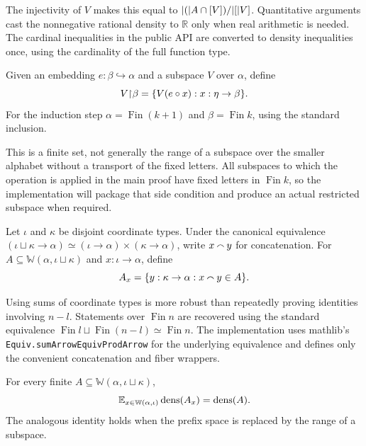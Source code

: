 The injectivity of $V$ makes this equal to
$\lvert (\rvert A\cap[V])/\lvert [\rvert V]$.  Quantitative arguments cast the nonnegative rational density to
$\mathbb R$ only when real arithmetic is needed.  The cardinal inequalities in the public API are
converted to density inequalities once, using the cardinality of the full function type.

\begin{definition}
\label{def:alphabet-restriction}
Given an embedding $e:\beta\hookrightarrow\alpha$ and a subspace $V$ over $\alpha$, define
\[
  V\mathord{\upharpoonright}\beta=\{V(e\circ x):x:\eta\to\beta\}.
\]
For the induction step $\alpha=\operatorname{Fin}(k+1)$ and
$\beta=\operatorname{Fin}k$, using the standard inclusion.
\end{definition}

This is a finite set, not generally the range of a subspace over the smaller alphabet without a
transport of the fixed letters.  All subspaces to which the operation is applied in the main proof
have fixed letters in $\operatorname{Fin}k$, so the implementation will package that side condition
and produce an actual restricted subspace when required.

\begin{definition}
\label{def:fiber}
Let $\iota$ and $\kappa$ be disjoint coordinate types.  Under the canonical equivalence
$(\iota\sqcup\kappa\to\alpha)\simeq(\iota\to\alpha)\times(\kappa\to\alpha)$, write
$x\mathbin{\smallfrown} y$ for concatenation.  For $A\subseteq\mathbb W(\alpha,\iota\sqcup\kappa)$ and
$x:\iota\to\alpha$, define
\[
  A_x=\{y:\kappa\to\alpha:x\mathbin{\smallfrown} y\in A\}.
\]
\end{definition}

Using sums of coordinate types is more robust than repeatedly proving identities involving
$n-l$.  Statements over $\operatorname{Fin}n$ are recovered using the standard equivalence
$\operatorname{Fin}l\sqcup\operatorname{Fin}(n-l)\simeq\operatorname{Fin}n$.
The implementation uses mathlib's \texttt{Equiv.sumArrowEquivProdArrow} for the underlying
equivalence and defines only the convenient concatenation and fiber wrappers.

\begin{lemma}
\label{lem:fiber-average}
For every finite $A\subseteq\mathbb W(\alpha,\iota\sqcup\kappa)$,
\[
  \mathbb{E}_{x\in\mathbb W(\alpha,\iota)}\operatorname{dens}(A_x)=\operatorname{dens}(A).
\]
The analogous identity holds when the prefix space is replaced by the range of a subspace.
\end{lemma}

